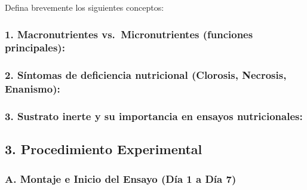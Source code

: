 \documentclass[
  spanish,
  10pt,
  letterpaper,
  twocolumn]{article}
\begin{document}
Defina brevemente los siguientes conceptos:

\subsubsection{1. Macronutrientes vs.~Micronutrientes (funciones
principales):}\label{macronutrientes-vs.-micronutrientes-funciones-principales}

\hrulefill

\hrulefill

\hrulefill

\hrulefill

\hrulefill

\subsubsection{2. Síntomas de deficiencia nutricional (Clorosis,
Necrosis,
Enanismo):}\label{suxedntomas-de-deficiencia-nutricional-clorosis-necrosis-enanismo}

\hrulefill

\hrulefill

\hrulefill

\hrulefill

\hrulefill

\subsubsection{3. Sustrato inerte y su importancia en ensayos
nutricionales:}\label{sustrato-inerte-y-su-importancia-en-ensayos-nutricionales}

\hrulefill

\hrulefill

\hrulefill

\hrulefill

\hrulefill

\subsection{3. Procedimiento
Experimental}\label{procedimiento-experimental}

\subsubsection{A. Montaje e Inicio del Ensayo (Día 1 a Día
7)}\label{a.-montaje-e-inicio-del-ensayo-duxeda-1-a-duxeda-7}
\end{document}
